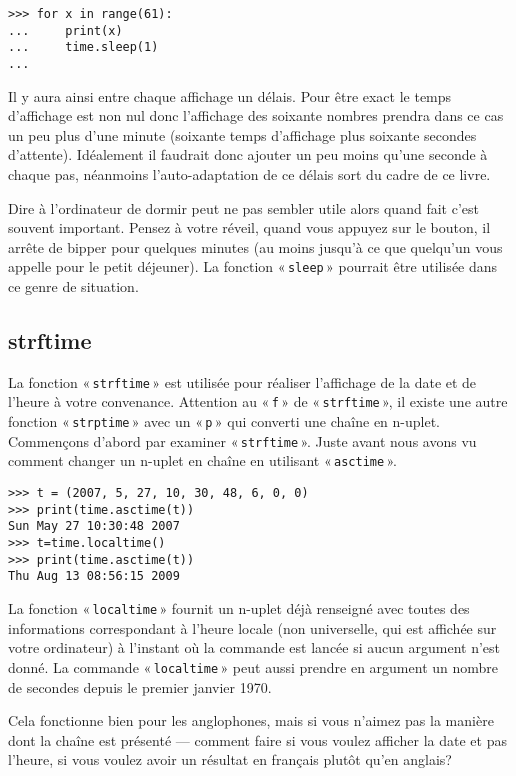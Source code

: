\begin{Verbatim}[frame=single,rulecolor=\color{gray}]
>>> for x in range(61):
...     print(x)
...     time.sleep(1)
...
\end{Verbatim}
Il y aura ainsi entre chaque affichage un délais. Pour être exact le temps d'affichage est non nul donc l'affichage des soixante nombres prendra dans ce cas un peu plus d'une minute (soixante temps d'affichage plus soixante secondes d'attente). Idéalement il faudrait donc ajouter un peu moins qu'une seconde à chaque pas, néanmoins l'auto-adaptation de ce délais sort du cadre de ce livre.

Dire à l'ordinateur de dormir peut ne pas sembler utile alors quand fait c'est souvent important. Pensez à votre réveil, quand vous appuyez sur le bouton, il arrête de bipper pour quelques minutes (au moins jusqu'à ce que quelqu'un vous appelle pour le petit déjeuner). La fonction « \texttt{sleep} » pourrait être utilisée dans ce genre de situation.

\subsection{strftime}

La fonction « \texttt{strftime} » est utilisée pour réaliser l'affichage de la date et de l'heure à votre convenance. Attention au « \texttt{f} » de « \texttt{strftime} », il existe une autre fonction « \texttt{strptime} » avec un « \texttt{p} » qui converti une chaîne en n-uplet.
Commençons d'abord par examiner « \texttt{strftime} ».
Juste avant nous avons vu comment changer un n-uplet en chaîne en utilisant « \texttt{asctime} ».

\begin{Verbatim}[frame=single,rulecolor=\color{gray}]
>>> t = (2007, 5, 27, 10, 30, 48, 6, 0, 0)
>>> print(time.asctime(t))
Sun May 27 10:30:48 2007
>>> t=time.localtime()
>>> print(time.asctime(t))
Thu Aug 13 08:56:15 2009
\end{Verbatim}



La fonction « \texttt{localtime} » fournit un n-uplet déjà renseigné avec toutes des informations correspondant à l'heure locale (non universelle, qui est affichée sur votre ordinateur) à l'instant où la commande est lancée si aucun argument n'est donné. La commande « \texttt{localtime} » peut aussi prendre en argument un nombre de secondes depuis le premier janvier 1970.   

Cela fonctionne bien pour les anglophones, mais si vous n'aimez pas la manière dont la chaîne est présenté --- comment faire si vous voulez afficher la date et pas l'heure, si vous voulez avoir un résultat en français plutôt qu'en anglais?

